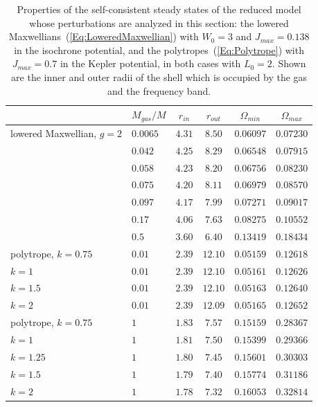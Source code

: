 \begin{table}[htp]
\begin{center}
\begin{tabular}{ll|cc|cc}
\hline\hline
 & $M_{gas}/M$ & $r_{in}$ & $r_{out}$ & $\Omega_{min}$ & $\Omega_{max}$ \\
\hline
lowered Maxwellian, $g = 2$ & $0.0065$ & $4.31$ & $8.50$ & $0.06097$ & $0.07230$ \\
 & $0.042$ & $4.25$ & $8.29$ & $0.06548$ & $0.07915$ \\
 & $0.058$ & $4.23$ & $8.20$ & $0.06756$ & $0.08230$ \\
 & $0.075$ & $4.20$ & $8.11$ & $0.06979$ & $0.08570$ \\
 & $0.097$ & $4.17$ & $7.99$ & $0.07271$ & $0.09017$ \\
 & $0.17$ & $4.06$ & $7.63$ & $0.08275$ & $0.10552$ \\
 & $0.5$ & $3.60$ & $6.40$ & $0.13419$ & $0.18434$ \\
\hline
polytrope, $k = 0.75$ & $0.01$ & $2.39$ & $12.10$ & $0.05159$ & $0.12618$ \\
\phantom{polytrope,} $k = 1$ & $0.01$ & $2.39$ & $12.10$ & $0.05161$ & $0.12626$ \\
\phantom{polytrope,} $k = 1.5$ & $0.01$ & $2.39$ & $12.10$ & $0.05163$ & $0.12640$ \\
\phantom{polytrope,} $k = 2$ & $0.01$ & $2.39$ & $12.09$ & $0.05165$ & $0.12652$ \\
\hline
polytrope, $k = 0.75$ & $1$ & $1.83$ & $7.57$ & $0.15159$ & $0.28367$ \\
\phantom{polytrope,} $k = 1$ & $1$ & $1.81$ & $7.50$ & $0.15399$ & $0.29366$ \\
\phantom{polytrope,} $k = 1.25$ & $1$ & $1.80$ & $7.45$ & $0.15601$ & $0.30303$ \\
\phantom{polytrope,} $k = 1.5$ & $1$ & $1.79$ & $7.40$ & $0.15774$ & $0.31186$ \\
\phantom{polytrope,} $k = 2$ & $1$ & $1.78$ & $7.32$ & $0.16053$ & $0.32814$ \\
\hline\hline
\end{tabular}
\end{center}
\caption{Properties of the self-consistent steady states of the reduced model whose perturbations are analyzed in this section: the lowered Maxwellians~(\ref{Eq:LoweredMaxwellian}) with $W_0 = 3$ and $J_{max} = 0.138$ in the isochrone potential, and the polytropes~(\ref{Eq:Polytrope}) with $J_{max} = 0.7$ in the Kepler potential, in both cases with $L_0 = 2$. Shown are the inner and outer radii of the shell which is occupied by the gas and the frequency band.}
\label{Tab:SteadyStates}
\end{table}

